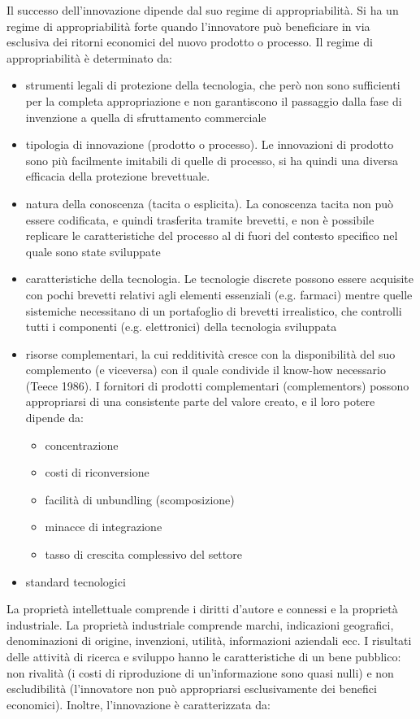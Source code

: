 \documentclass[answers, a4paper, 11pt]{exam}
\begin{document}
Il successo dell'innovazione dipende dal suo regime di appropriabilità. Si ha un regime di appropriabilità forte quando l'innovatore può beneficiare in via esclusiva dei ritorni economici del nuovo prodotto o processo. Il regime di appropriabilità è determinato da:

\begin{itemize}
    \item strumenti legali di protezione della tecnologia, che però non sono sufficienti per la completa appropriazione e non garantiscono il passaggio dalla fase di invenzione a quella di sfruttamento commerciale
    \item tipologia di innovazione (prodotto o processo). Le innovazioni di prodotto sono più facilmente imitabili di quelle di processo, si ha quindi una diversa efficacia della protezione brevettuale.
    \item natura della conoscenza (tacita o esplicita). La conoscenza tacita non può essere codificata, e quindi trasferita tramite brevetti, e non è possibile replicare le caratteristiche del processo al di fuori del contesto specifico nel quale sono state sviluppate
    \item caratteristiche della tecnologia. Le tecnologie discrete possono essere acquisite con pochi brevetti relativi agli elementi essenziali (e.g. farmaci) mentre quelle sistemiche necessitano di un portafoglio di brevetti irrealistico, che controlli tutti i componenti (e.g. elettronici) della tecnologia sviluppata
    \item risorse complementari, la cui redditività cresce con la disponibilità del suo complemento (e viceversa) con il quale condivide il know-how necessario (Teece 1986). I fornitori di prodotti complementari (complementors) possono appropriarsi di una consistente parte del valore creato, e il loro potere dipende da:
    \begin{itemize}
        \item concentrazione
        \item costi di riconversione
        \item facilità di unbundling (scomposizione)
        \item minacce di integrazione
        \item tasso di crescita complessivo del settore
    \end{itemize}
    \item standard tecnologici
\end{itemize}

La proprietà intellettuale comprende i diritti d'autore e connessi e la proprietà industriale.
La proprietà industriale comprende marchi, indicazioni geografici, denominazioni di origine, invenzioni, utilità, informazioni aziendali ecc. 
I risultati delle attività di ricerca e sviluppo hanno le caratteristiche di un bene pubblico: non rivalità (i costi di riproduzione di un'informazione sono quasi nulli) e non escludibilità (l'innovatore non può appropriarsi esclusivamente dei benefici economici).
Inoltre, l'innovazione è caratterizzata da:
\end{document}
